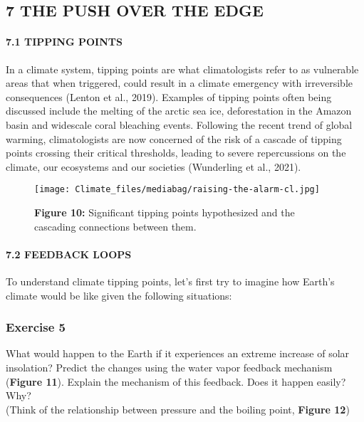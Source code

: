 \documentclass[
  letterpaper,
  DIV=11,
  numbers=noendperiod]{scrartcl}
\let\oldparagraph\paragraph
\renewcommand{\paragraph}[1]{\oldparagraph{#1}\mbox{}}
\begin{document}
\hypertarget{the-push-over-the-edge}{%
\subsection{7 \textbar{} THE PUSH OVER THE
EDGE}\label{the-push-over-the-edge}}

\hypertarget{tipping-points}{%
\paragraph{7.1 TIPPING POINTS}\label{tipping-points}}

In a climate system, tipping points are what climatologists refer to as
vulnerable areas that when triggered, could result in a climate
emergency with irreversible consequences (Lenton et al., 2019). Examples
of tipping points often being discussed include the melting of the
arctic sea ice, deforestation in the Amazon basin and widescale coral
bleaching events. Following the recent trend of global warming,
climatologists are now concerned of the risk of a cascade of tipping
points crossing their critical thresholds, leading to severe
repercussions on the climate, our ecosystems and our societies
(Wunderling et al., 2021).

\begin{figure}

{\centering \texttt{[image: Climate\_files/mediabag/raising-the-alarm-cl.jpg]}

}

\caption{\textbf{Figure 10:} Significant tipping points hypothesized and
the cascading connections between them.}

\end{figure}

\hypertarget{feedback-loops}{%
\paragraph{7.2 FEEDBACK LOOPS}\label{feedback-loops}}

To understand climate tipping points, let's first try to imagine how
Earth's climate would be like given the following situations:

\subsubsection{\texorpdfstring{\textbf{Exercise 5}}{Exercise 5}}

What would happen to the Earth if it experiences an extreme increase of
solar insolation? Predict the changes using the water vapor feedback
mechanism (\textbf{Figure 11}). Explain the mechanism of this feedback.
Does it happen easily? Why?\\
(Think of the relationship between pressure and the boiling point,
\textbf{Figure 12})
\end{document}
